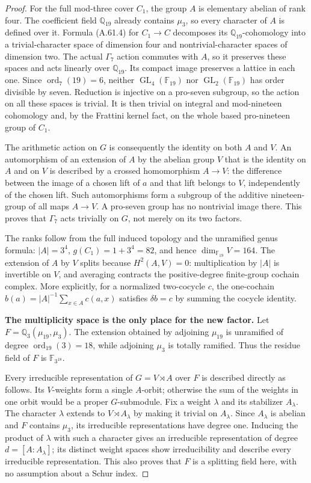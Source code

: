 \begin{proof}
For the full mod-three cover $C_1$, the group $A$
is elementary abelian of rank four.  The coefficient
field $\mathbb Q_{19}$ already contains $\mu_3$,
so every character of $A$ is defined over it.
Formula (A.61.4) for $C_1\to C$ decomposes its
$\mathbb Q_{19}$-cohomology into a trivial-character
space of dimension four and nontrivial-character
spaces of dimension two.  The actual $\Gamma_7$
action commutes with $A$, so it preserves these
spaces and acts linearly over $\mathbb Q_{19}$.
Its compact image preserves a lattice in each one.
Since $\operatorname{ord}_7(19)=6$, neither
$\operatorname{GL}_4(\mathbb F_{19})$ nor
$\operatorname{GL}_2(\mathbb F_{19})$ has order
divisible by seven.  Reduction is injective on a
pro-seven subgroup, so the action on all these
spaces is trivial.  It is then trivial on integral
and mod-nineteen cohomology and, by the Frattini
kernel fact, on the whole based pro-nineteen group
of $C_1$.

The arithmetic action on $G$ is consequently the
identity on both $A$ and $V$.  An automorphism of
an extension of $A$ by the abelian group $V$ that
is the identity on $A$ and on $V$ is described by
a crossed homomorphism $A\to V$: the difference
between the image of a chosen lift of $a$ and
that lift belongs to $V$, independently of the
chosen lift.  Such automorphisms form a subgroup
of the additive nineteen-group of all maps
$A\to V$.  A pro-seven group has no nontrivial
image there.  This proves that $\Gamma_7$ acts
trivially on $G$, not merely on its two factors.

The ranks follow from the full induced topology
and the unramified genus formula:
$|A|=3^4$, $g(C_1)=1+3^4=82$, and hence
$\dim_{\mathbb F_{19}}V=164$.
The extension of $A$ by $V$ splits because
$H^2(A,V)=0$: multiplication by $|A|$ is invertible
on $V$, and averaging contracts the positive-degree
finite-group cochain complex.  More explicitly,
for a normalized two-cocycle $c$, the one-cochain
$b(a)=|A|^{-1}\sum_{x\in A}c(a,x)$ satisfies
$\delta b=c$ by summing the cocycle identity.

\medskip\noindent\textbf{The multiplicity space is the only place for the new factor.}
Let $F=\mathbb Q_3(\mu_{19},\mu_3)$.
The extension obtained by adjoining $\mu_{19}$
is unramified of degree
$\operatorname{ord}_{19}(3)=18$, while adjoining
$\mu_3$ is totally ramified.  Thus the residue
field of $F$ is $\mathbb F_{3^{18}}$.

Every irreducible representation of $G=V\rtimes A$
over $F$ is described directly as follows.  Its
$V$-weights form a single $A$-orbit; otherwise the
sum of the weights in one orbit would be a proper
$G$-submodule.  Fix a weight $\lambda$ and its
stabilizer $A_\lambda$.  The character $\lambda$
extends to $V\rtimes A_\lambda$ by making it
trivial on $A_\lambda$.  Since $A_\lambda$ is
abelian and $F$ contains $\mu_3$, its irreducible
representations have degree one.  Inducing the
product of $\lambda$ with such a character gives
an irreducible representation of degree
$d=[A:A_\lambda]$; its distinct weight spaces
show irreducibility and describe every irreducible
representation.  This also proves that $F$ is a
splitting field here, with no assumption about a
Schur index.


\end{proof}
